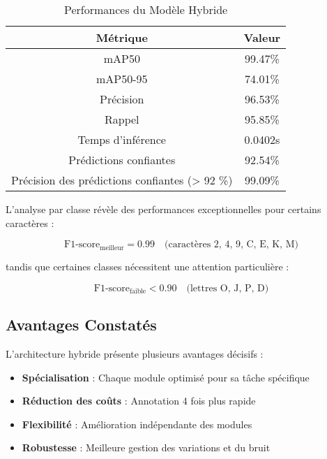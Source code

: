 \documentclass[letterpaper, 10 pt, conference]{ieeeconf}  %
\begin{document}
\begin{table}[h]
\caption{Performances du Modèle Hybride}
\label{table_hybride}
\begin{center}
\begin{tabular}{|c|c|}
\hline
\textbf{Métrique} & \textbf{Valeur} \\
\hline
mAP50 & 99.47\% \\
\hline
mAP50-95 & 74.01\% \\
\hline
Précision & 96.53\% \\
\hline
Rappel & 95.85\% \\
\hline
Temps d'inférence & 0.0402s \\
\hline
Prédictions confiantes & 92.54\% \\
\hline
Précision des prédictions confiantes (> 92 \%) & 99.09\% \\
\hline
\end{tabular}
\end{center}
\end{table}

L'analyse par classe révèle des performances exceptionnelles pour certains caractères :

\begin{equation}
\text{F1-score}_{\text{meilleur}} = 0.99 \quad \text{(caractères 2, 4, 9, C, E, K, M)}
\end{equation}

tandis que certaines classes nécessitent une attention particulière :

\begin{equation}
\text{F1-score}_{\text{faible}} < 0.90 \quad \text{(lettres O, J, P, D)}
\end{equation}

\subsection{Avantages Constatés}

L'architecture hybride présente plusieurs avantages décisifs :

\begin{itemize}
\item \textbf{Spécialisation} : Chaque module optimisé pour sa tâche spécifique
\item \textbf{Réduction des coûts} : Annotation 4 fois plus rapide
\item \textbf{Flexibilité} : Amélioration indépendante des modules
\item \textbf{Robustesse} : Meilleure gestion des variations et du bruit
\end{itemize}
\end{document}
